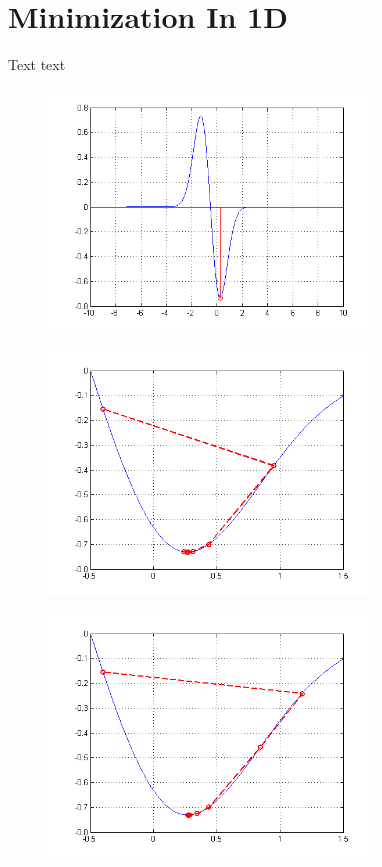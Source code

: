 \documentclass[journal]{IEEEtran}
\begin{document}
\section{Minimization In 1D}

Text text


\begin{figure}
\centering
\includegraphics[width=3.4in]{figures/1d-bruteForce.png}
\caption{}
\label{figBF}
\end{figure}

\begin{figure}
\centering
\includegraphics[width=3.4in]{figures/1d-goldenSearch.png}
\caption{}
\label{figGS}
\end{figure}

\begin{figure}
\centering
\includegraphics[width=3.4in]{figures/1d-brentsMethod.png}
\caption{}
\label{figBM}
\end{figure}
\end{document}
